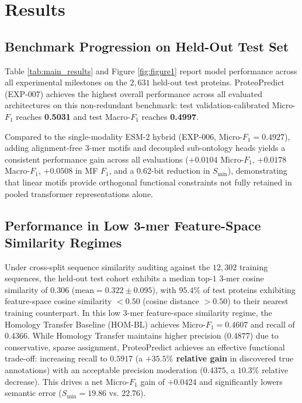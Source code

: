 \documentclass[twocolumn,10pt]{article}
\begin{document}
\section{Results}

\subsection{Benchmark Progression on Held-Out Test Set}
Table \ref{tab:main_results} and Figure \ref{fig:figure1} report model performance across all experimental milestones on the $2,631$ held-out test proteins. ProteoPredict (EXP-007) achieves the highest overall performance across all evaluated architectures on this non-redundant benchmark: test validation-calibrated Micro-$F_1$ reaches \textbf{0.5031} and test Macro-$F_1$ reaches \textbf{0.4997}.

Compared to the single-modality ESM-2 hybrid (EXP-006, Micro-$F_1 = 0.4927$), adding alignment-free $3$-mer motifs and decoupled sub-ontology heads yields a consistent performance gain across all evaluations ($+0.0104$ Micro-$F_1$, $+0.0178$ Macro-$F_1$, $+0.0508$ in MF $F_1$, and a $0.62$-bit reduction in $S_{\min}$), demonstrating that linear motifs provide orthogonal functional constraints not fully retained in pooled transformer representations alone.

\subsection{Performance in Low 3-mer Feature-Space Similarity Regimes}
Under cross-split sequence similarity auditing against the $12,302$ training sequences, the held-out test cohort exhibits a median top-$1$ $3$-mer cosine similarity of $0.306$ ($\text{mean} = 0.322 \pm 0.095$), with $95.4\%$ of test proteins exhibiting feature-space cosine similarity $< 0.50$ (cosine distance $> 0.50$) to their nearest training counterpart. In this low $3$-mer feature-space similarity regime, the Homology Transfer Baseline (HOM-BL) achieves Micro-$F_1 = 0.4607$ and recall of $0.4366$. While Homology Transfer maintains higher precision ($0.4877$) due to conservative, sparse assignment, ProteoPredict achieves an effective functional trade-off: increasing recall to \textbf{$0.5917$} (a \textbf{$+35.5\%$ relative gain} in discovered true annotations) with an acceptable precision moderation ($0.4375$, a $10.3\%$ relative decrease). This drives a net Micro-$F_1$ gain of \textbf{$+0.0424$} and significantly lowers semantic error ($S_{\min} = 19.86$ vs. $22.76$).
\end{document}
